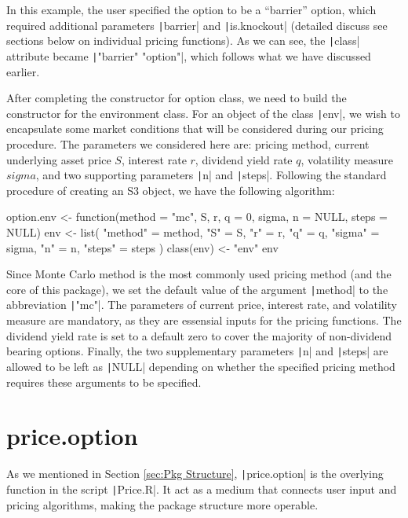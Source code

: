 In this example, the user specified the option to be a ``barrier'' option, which required additional parameters \texttt|barrier| and \texttt|is.knockout| (detailed discuss see sections below on individual pricing functions). As we can see, the \texttt|class| attribute became \texttt|"barrier" "option"|, which follows what we have discussed earlier.

After completing the constructor for option class, we need to build the constructor for the environment class. For an object of the class \texttt|env|, we wish to encapsulate some market conditions that will be considered during our pricing procedure. The parameters we considered here are: pricing method, current underlying asset price $S$, interest rate $r$, dividend yield rate $q$, volatility measure $sigma$, and two supporting parameters \texttt|n| and \texttt|steps|. Following the standard procedure of creating an S3 object, we have the following algorithm:

\begin{Rminted}
option.env <- function(method = "mc", S, r, q = 0, sigma, n = NULL, steps = NULL) {
    env <- list(
        "method" = method,
        "S" = S,
        "r" = r,
        "q" = q,
        "sigma" = sigma,
        "n" = n,
        "steps" = steps
    )
    class(env) <- "env"
    env
}
\end{Rminted}

Since Monte Carlo method is the most commonly used pricing method (and the core of this package), we set the default value of the argument \texttt|method| to the abbreviation \texttt|"mc"|. The parameters of current price, interest rate, and volatility measure are mandatory, as they are essensial inputs for the pricing functions. The dividend yield rate is set to a default zero to cover the majority of non-dividend bearing options. Finally, the two supplementary parameters \texttt|n| and \texttt|steps| are allowed to be left as \texttt|NULL| depending on whether the specified pricing method requires these arguments to be specified.

\section{price.option}

As we mentioned in Section \ref{sec:Pkg Structure}, \texttt|price.option| is the overlying function in the script \texttt|Price.R|. It act as a medium that connects user input and pricing algorithms, making the package structure more operable.

